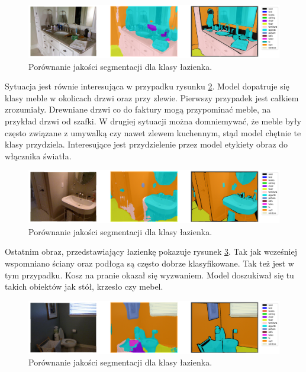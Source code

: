 \begin{figure}[ht!]
    \centering
    \includegraphics[width=\textwidth]{img/preds_analysis/gt_vs_pred/bathroom-1.png}
    \caption{Porównanie jakości segmentacji dla klasy łazienka.}
    \label{fig:bathroom-pred-1}
\end{figure}

Sytuacja jest równie interesująca w przypadku rysunku \ref{fig:bathroom-pred-2}. Model dopatruje się klasy meble w okolicach drzwi oraz przy zlewie. Pierwszy przypadek jest całkiem zrozumiały. Drewniane drzwi co do faktury mogą przypominać meble, na przykład drzwi od szafki. W drugiej sytuacji można domniemywać, że meble były często związane z umywalką czy nawet zlewem kuchennym, stąd model chętnie te klasy przydziela. Interesujące jest przydzielenie przez model etykiety obraz do włącznika światła.

\begin{figure}[ht!]
    \centering
    \includegraphics[width=\textwidth]{img/preds_analysis/gt_vs_pred/bathroom-2.png}
    \caption{Porównanie jakości segmentacji dla klasy łazienka.}
    \label{fig:bathroom-pred-2}
\end{figure}

Ostatnim obraz, przedstawiający łazienkę pokazuje rysunek \ref{fig:bathroom-pred-3}. Tak jak wcześniej wspomniano ściany oraz podłoga są często dobrze klasyfikowane. Tak też jest w tym przypadku. Kosz na pranie okazał się wyzwaniem. Model doszukiwał się tu takich obiektów jak stół, krzesło czy mebel.

\begin{figure}[ht!]
    \centering
    \includegraphics[width=\textwidth]{img/preds_analysis/gt_vs_pred/bathroom-3.png}
    \caption{Porównanie jakości segmentacji dla klasy łazienka.}
    \label{fig:bathroom-pred-3}
\end{figure}

